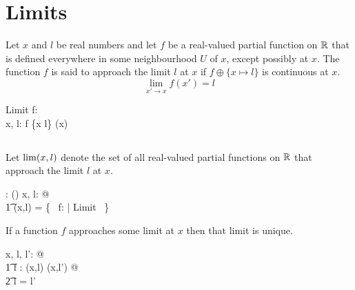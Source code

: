 \documentclass[11pt, oneside]{article}
\begin{document}
\section{Limits}

Let $x$ and $l$ be real numbers and
let $f$ be a real-valued partial function on $\mathbb{R}$ that is defined everywhere in some
neighbourhood $U$ of $x$, except possibly at $x$.
The function $f$ is said to approach the limit $l$ at $x$ if $f \oplus \{ x \mapsto l \}$ is continuous at $x$.
$$
	\lim_{x' \to x}{f(x')} = l
$$

\begin{schema}{Limit}
	f: \R \pfun \R \\
	x, l: \R
\where
	f \oplus \{x \mapsto l\} \in \CzeroR(x)
\end{schema}

\subsection{}

Let $\operatorname{lim}(x,l)$ denote the set of all real-valued partial functions on $\mathbb{R}$ that approach the limit $l$ at $x$.

\begin{axdef}
	\limRR: \R \cross \R \fun \power(\R \pfun \R)
\where
	\forall x, l: \R @ \\
	\t1	\limRR(x,l) = \{~ f: \R \pfun \R | Limit ~\}
\end{axdef}

\begin{theorem}
If a function $f$ approaches some limit at $x$ then that limit is unique.
\begin{zed}
	\forall x, l, l': \R @ \\
	\t1	\forall f : \limRR(x,l) \cap \limRR(x,l') @ \\
	\t2		l = l'
\end{zed}
\end{theorem}
\end{document}
